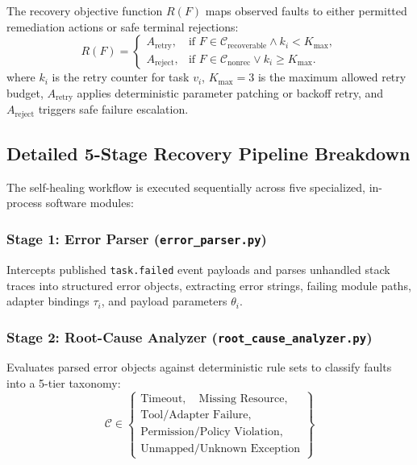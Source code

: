 \documentclass[conference]{IEEEtran}
\begin{document}
The recovery objective function $R(F)$ maps observed faults to either permitted remediation actions or safe terminal rejections:
\begin{equation}
R(F) =
\begin{cases}
A_{\text{retry}}, & \text{if } F \in \mathcal{C}_{\text{recoverable}} \land k_i < K_{\text{max}}, \\
A_{\text{reject}}, & \text{if } F \in \mathcal{C}_{\text{nonrec}} \lor k_i \ge K_{\text{max}}.
\end{cases}
\end{equation}
where $k_i$ is the retry counter for task $v_i$, $K_{\text{max}} = 3$ is the maximum allowed retry budget, $A_{\text{retry}}$ applies deterministic parameter patching or backoff retry, and $A_{\text{reject}}$ triggers safe failure escalation.

\subsection{Detailed 5-Stage Recovery Pipeline Breakdown}
The self-healing workflow is executed sequentially across five specialized, in-process software modules:

\subsubsection{Stage 1: Error Parser (\texttt{error\_parser.py})}
Intercepts published \texttt{task.failed} event payloads and parses unhandled stack traces into structured error objects, extracting error strings, failing module paths, adapter bindings $\tau_i$, and payload parameters $\theta_i$.

\subsubsection{Stage 2: Root-Cause Analyzer (\texttt{root\_cause\_analyzer.py})}
Evaluates parsed error objects against deterministic rule sets to classify faults into a 5-tier taxonomy:
\begin{equation}
\mathcal{C} \in
\begin{Bmatrix}
\text{Timeout}, \quad \text{Missing Resource}, \\
\text{Tool/Adapter Failure}, \\
\text{Permission/Policy Violation}, \\
\text{Unmapped/Unknown Exception}
\end{Bmatrix}
\end{equation}
\end{document}
